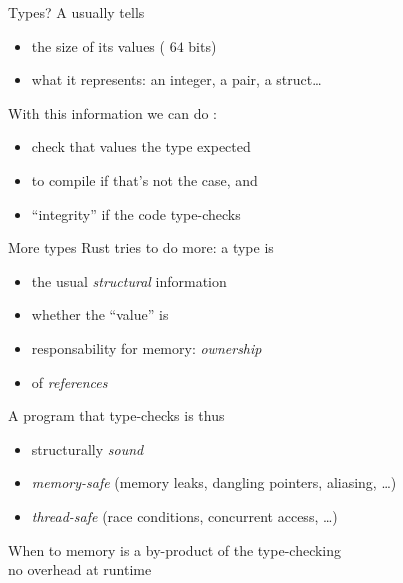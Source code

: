 \documentclass[10pt]{beamer}
\begin{document}
\begin{frame}{Types?}
  A  usually tells
  \begin{itemize}
    \item the size of its values ( $64$ bits)
    \item what it represents: an integer, a pair, a struct\ldots
  \end{itemize}
  \bigskip
  \pause
  With this information we can do :
  \begin{itemize}
    \item check that values  the type expected
    \item {} to compile if that's not the case, and
    \item {} ``integrity'' if the code type-checks
  \end{itemize}
\end{frame}





\begin{frame}{More types}
  Rust tries to do more: a type is
  \begin{itemize}
    \item the usual \emph{structural} information
    \item whether the ``value'' is 
    \item responsability for  memory: \emph{ownership}
    \item {} of \emph{references}
  \end{itemize}
  \bigskip
  \pause
  A program that type-checks is thus 
  \begin{itemize}
    \item structurally \emph{sound}
    \item \emph{memory-safe}
      (memory leaks, dangling pointers, aliasing, \ldots)
    \item \emph{thread-safe}
      (race conditions, concurrent access, \ldots)
  \end{itemize}
  \medskip
  \pause
  When to  memory is a by-product of the type-checking\\
  \daimpl no overhead at runtime
\end{frame}
\end{document}
